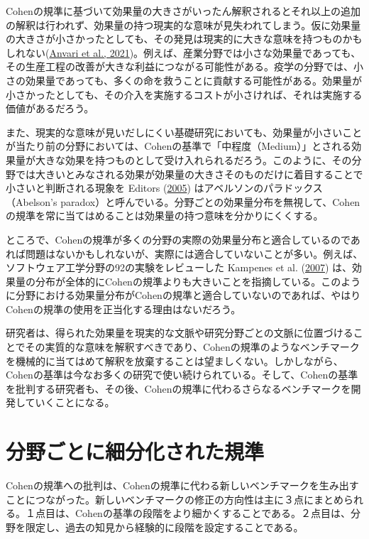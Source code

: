 \documentclass[
  ja=standard, xelatex, base=12pt]{bxjsreport}
\begin{document}
Cohenの規準に基づいて効果量の大きさがいったん解釈されるとそれ以上の追加の解釈は行われず、効果量の持つ現実的な意味が見失われてしまう。仮に効果量の大きさが小さかったとしても、その発見は現実的に大きな意味を持つものかもしれない(\protect\hyperlink{ref-anvari2021}{Anvari et al., 2021})。例えば、産業分野では小さな効果量であっても、その生産工程の改善が大きな利益につながる可能性がある。疫学の分野では、小さの効果量であっても、多くの命を救うことに貢献する可能性がある。効果量が小さかったとしても、その介入を実施するコストが小さければ、それは実施する価値があるだろう。

また、現実的な意味が見いだしにくい基礎研究においても、効果量が小さいことが当たり前の分野においては、Cohenの基準で「中程度（Medium）」とされる効果量が大きな効果を持つものとして受け入れられるだろう。このように、その分野では大きいとみなされる効果が効果量の大きさそのものだけに着目することで小さいと判断される現象を Editors (\protect\hyperlink{ref-editors2005}{2005}) はアベルソンのパラドックス（Abelson's paradox）と呼んでいる。分野ごとの効果量分布を無視して、Cohenの規準を常に当てはめることは効果量の持つ意味を分かりにくくする。

ところで、Cohenの規準が多くの分野の実際の効果量分布と適合しているのであれば問題はないかもしれないが、実際には適合していないことが多い。例えば、ソフトウェア工学分野の92の実験をレビューした Kampenes et al. (\protect\hyperlink{ref-kampenes2007}{2007}) は、効果量の分布が全体的にCohenの規準よりも大きいことを指摘している。このように分野における効果量分布がCohenの規準と適合していないのであれば、やはりCohenの規準の使用を正当化する理由はないだろう。

研究者は、得られた効果量を現実的な文脈や研究分野ごとの文脈に位置づけることでその実質的な意味を解釈すべきであり、Cohenの規準のようなベンチマークを機械的に当てはめて解釈を放棄することは望ましくない。しかしながら、Cohenの基準は今なお多くの研究で使い続けられている。そして、Cohenの基準を批判する研究者も、その後、Cohenの規準に代わるさらなるベンチマークを開発していくことになる。

\hypertarget{ux5206ux91ceux3054ux3068ux306bux7d30ux5206ux5316ux3055ux308cux305fux898fux6e96}{%
\section{分野ごとに細分化された規準}\label{ux5206ux91ceux3054ux3068ux306bux7d30ux5206ux5316ux3055ux308cux305fux898fux6e96}}

Cohenの規準への批判は、Cohenの規準に代わる新しいベンチマークを生み出すことにつながった。新しいベンチマークの修正の方向性は主に３点にまとめられる。１点目は、Cohenの基準の段階をより細かくすることである。２点目は、分野を限定し、過去の知見から経験的に段階を設定することである。
\end{document}
